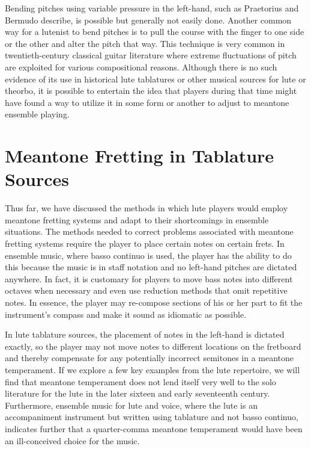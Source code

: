 Bending pitches using variable pressure in the left-hand, such as Praetorius and Bermudo
describe, is possible but generally not easily done.  Another common way for a lutenist to
bend pitches is to pull the course with the finger to one side or the other and alter the
pitch that way. This technique is very common in twentieth-century classical guitar
literature where extreme fluctuations of pitch are exploited for various compositional
reasons. Although there is no such evidence of its use in historical lute tablatures or
other musical sources for lute or theorbo, it is possible to entertain the idea that
players during that time might have found a way to utilize it in some form or another to
adjust to meantone ensemble playing.

\section{Meantone Fretting in Tablature Sources}

Thus far, we have discussed the methods in which lute players would employ meantone
fretting systems and adapt to their shortcomings in ensemble situations.  The methods
needed to correct problems associated with meantone fretting systems require the player to
place certain notes on certain frets.  In ensemble music, where basso continuo is used,
the player has the ability to do this because the music is in staff notation and no
left-hand pitches are dictated anywhere.  In fact, it is customary for players to move
bass notes into different octaves when necessary and even use reduction methods that omit
repetitive notes.  In essence, the player may re-compose sections of his or her part to
fit the instrument's compass and make it sound as idiomatic as possible.

In lute tablature sources, the placement of notes in the left-hand is dictated exactly, so
the player may not move notes to different locations on the fretboard and thereby
compensate for any potentially incorrect semitones in a meantone temperament.  If we
explore a few key examples from the lute repertoire, we will find that meantone
temperament does not lend itself very well to the solo literature for the lute in the
later sixteen and early seventeenth century. Furthermore, ensemble music for lute and
voice, where the lute is an accompaniment instrument but written using tablature and not
basso continuo, indicates further that a quarter-comma meantone temperament would have
been an ill-conceived choice for the music.

